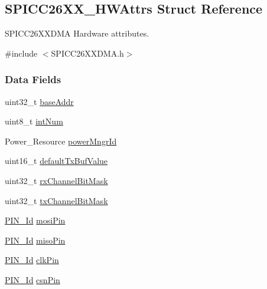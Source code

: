 \subsection{S\-P\-I\-C\-C26\-X\-X\-\_\-\-H\-W\-Attrs Struct Reference}
\label{struct_s_p_i_c_c26_x_x___h_w_attrs}


S\-P\-I\-C\-C26\-X\-X\-D\-M\-A Hardware attributes.  




{\ttfamily \#include $<$S\-P\-I\-C\-C26\-X\-X\-D\-M\-A.\-h$>$}

\subsubsection*{Data Fields}
\begin{DoxyCompactItemize}
\item 
uint32\-\_\-t \hyperlink{struct_s_p_i_c_c26_x_x___h_w_attrs_a7e7cb3e32890a0b812a4c0bf989506a1}{base\-Addr}
\item 
uint8\-\_\-t \hyperlink{struct_s_p_i_c_c26_x_x___h_w_attrs_a44bca6f2ec5dbdd3b2b33421150763f6}{int\-Num}
\item 
Power\-\_\-\-Resource \hyperlink{struct_s_p_i_c_c26_x_x___h_w_attrs_a0deb3d84474b2ffd1400b12077045e61}{power\-Mngr\-Id}
\item 
uint16\-\_\-t \hyperlink{struct_s_p_i_c_c26_x_x___h_w_attrs_ac0471da0f3145bd1550e2ba4df579e96}{default\-Tx\-Buf\-Value}
\item 
uint32\-\_\-t \hyperlink{struct_s_p_i_c_c26_x_x___h_w_attrs_aabed07f4796ecf513a53a8b750347d18}{rx\-Channel\-Bit\-Mask}
\item 
uint32\-\_\-t \hyperlink{struct_s_p_i_c_c26_x_x___h_w_attrs_a373e75c95a12324d6b6e7ad99aa50630}{tx\-Channel\-Bit\-Mask}
\item 
\hyperlink{_p_i_n_8h_a9ae8197f460bb76ea09a84f47d09921f}{P\-I\-N\-\_\-\-Id} \hyperlink{struct_s_p_i_c_c26_x_x___h_w_attrs_ad92b8c26ba67fbb59433d8ba92e66e6e}{mosi\-Pin}
\item 
\hyperlink{_p_i_n_8h_a9ae8197f460bb76ea09a84f47d09921f}{P\-I\-N\-\_\-\-Id} \hyperlink{struct_s_p_i_c_c26_x_x___h_w_attrs_a1da19170e674ae1e4e987dae134ccaef}{miso\-Pin}
\item 
\hyperlink{_p_i_n_8h_a9ae8197f460bb76ea09a84f47d09921f}{P\-I\-N\-\_\-\-Id} \hyperlink{struct_s_p_i_c_c26_x_x___h_w_attrs_ab7cf65653337166fab5ddf80af15de8b}{clk\-Pin}
\item 
\hyperlink{_p_i_n_8h_a9ae8197f460bb76ea09a84f47d09921f}{P\-I\-N\-\_\-\-Id} \hyperlink{struct_s_p_i_c_c26_x_x___h_w_attrs_a95e4b9fb826bd28501c823e42e7d4ba5}{csn\-Pin}
\end{DoxyCompactItemize}


